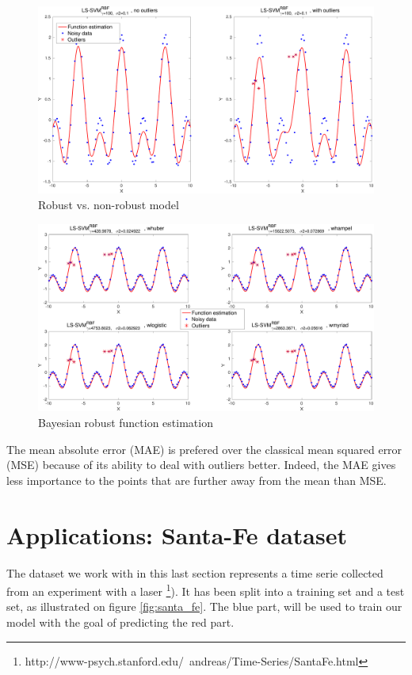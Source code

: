 \documentclass[11pt, a4paper]{article}
\begin{document}
\begin{figure}[H]
    \centering
    \includegraphics[scale=.40]{robust_outliers.pdf}
    \caption{Robust vs. non-robust model}
    \label{fig:robust_ouliers}
\end{figure}

\begin{figure}[H]
    \centering
    \includegraphics[scale=.40]{bayes_robust.pdf}
    \caption{Bayesian robust function estimation}
    \label{fig:bayes_robust}
\end{figure}

\newpage
The mean absolute error (MAE) is prefered over the classical mean
squared error (MSE) because of its ability to deal with outliers
better. Indeed, the MAE gives less importance to the points that are
further away from the mean than MSE.

\section{Applications: Santa-Fe dataset}

The dataset we work with in this last section represents a time serie
collected from an experiment with a laser
\footnote{http://www-psych.stanford.edu/~andreas/Time-Series/SantaFe.html}). It
has been split into a training set and a test set, as illustrated on
figure \ref{fig:santa_fe}. The blue part, will be used to train our
model with the goal of predicting the red part.
\end{document}
